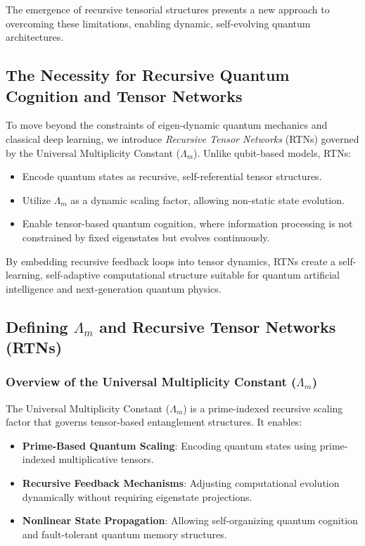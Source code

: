 \documentclass{article}
\theoremstyle{plain}
\begin{document}
The emergence of recursive tensorial structures presents a new approach to overcoming these limitations, enabling dynamic, self-evolving quantum architectures.

\subsection{The Necessity for Recursive Quantum Cognition and Tensor Networks}

To move beyond the constraints of eigen-dynamic quantum mechanics and classical deep learning, we introduce \textit{Recursive Tensor Networks} (RTNs) governed by the Universal Multiplicity Constant ($\Lambda_m$). Unlike qubit-based models, RTNs:
\begin{itemize}
    \item Encode quantum states as recursive, self-referential tensor structures.
    \item Utilize $\Lambda_m$ as a dynamic scaling factor, allowing non-static state evolution.
    \item Enable tensor-based quantum cognition, where information processing is not constrained by fixed eigenstates but evolves continuously.
\end{itemize}

By embedding recursive feedback loops into tensor dynamics, RTNs create a self-learning, self-adaptive computational structure suitable for quantum artificial intelligence and next-generation quantum physics.

\subsection{Defining $\Lambda_m$ and Recursive Tensor Networks (RTNs)}

\subsubsection{Overview of the Universal Multiplicity Constant ($\Lambda_m$)}

The Universal Multiplicity Constant ($\Lambda_m$) is a prime-indexed recursive scaling factor that governs tensor-based entanglement structures. It enables:
\begin{itemize}
    \item \textbf{Prime-Based Quantum Scaling}: Encoding quantum states using prime-indexed multiplicative tensors.
    \item \textbf{Recursive Feedback Mechanisms}: Adjusting computational evolution dynamically without requiring eigenstate projections.
    \item \textbf{Nonlinear State Propagation}: Allowing self-organizing quantum cognition and fault-tolerant quantum memory structures.
\end{itemize}
\end{document}
